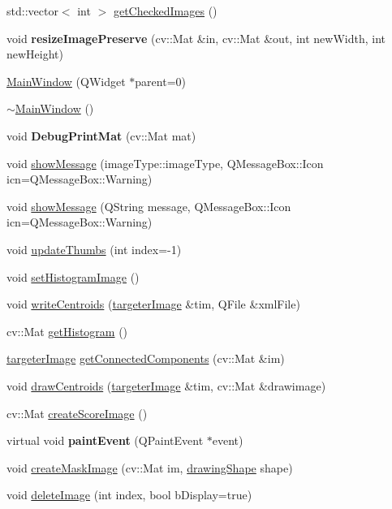 \begin{DoxyCompactItemize}
\item 
std\+::vector$<$ int $>$ \hyperlink{class_main_window_a1e798fdae21c3294495ea7994df1887a}{get\+Checked\+Images} ()
\item 
\mbox{\label{class_main_window_a2b4203abdf454313ed5bf11d38ae70f5}} 
void {\bfseries resize\+Image\+Preserve} (cv\+::\+Mat \&in, cv\+::\+Mat \&out, int new\+Width, int new\+Height)
\item 
\hyperlink{class_main_window_a8b244be8b7b7db1b08de2a2acb9409db}{Main\+Window} (Q\+Widget $\ast$parent=0)
\item 
\hyperlink{class_main_window_ae98d00a93bc118200eeef9f9bba1dba7}{$\sim$\+Main\+Window} ()
\item 
\mbox{\label{class_main_window_a838a9764a5001c205b964fd5e89742d2}} 
void {\bfseries Debug\+Print\+Mat} (cv\+::\+Mat mat)
\item 
void \hyperlink{class_main_window_a280d25148ac076ca817d411372584ae5}{show\+Message} (image\+Type\+::image\+Type, Q\+Message\+Box\+::\+Icon icn=Q\+Message\+Box\+::\+Warning)
\item 
void \hyperlink{class_main_window_aebde68c58d77b71d20fa6816b751356e}{show\+Message} (Q\+String message, Q\+Message\+Box\+::\+Icon icn=Q\+Message\+Box\+::\+Warning)
\item 
void \hyperlink{class_main_window_a89dfa31ef44692bb1d7307f0c35838c0}{update\+Thumbs} (int index=-\/1)
\item 
void \hyperlink{class_main_window_a5e130e8122dbab96f931a7ecc41086d3}{set\+Histogram\+Image} ()
\item 
void \hyperlink{class_main_window_aa137f4371bae807873da7862f4102521}{write\+Centroids} (\hyperlink{classtargeter_image}{targeter\+Image} \&tim, Q\+File \&xml\+File)
\item 
cv\+::\+Mat \hyperlink{class_main_window_a2734ce9308b5847a561f00b2fc9066aa}{get\+Histogram} ()
\item 
\hyperlink{classtargeter_image}{targeter\+Image} \hyperlink{class_main_window_a49cfabc6ef4845c5a9b5c9a92c9d4e2e}{get\+Connected\+Components} (cv\+::\+Mat \&im)
\item 
void \hyperlink{class_main_window_ad68b6789cc86ef20cd7cedd6de8d4ed2}{draw\+Centroids} (\hyperlink{classtargeter_image}{targeter\+Image} \&tim, cv\+::\+Mat \&drawimage)
\item 
cv\+::\+Mat \hyperlink{class_main_window_a8d87cd33d22ce614c9d7945264588e5f}{create\+Score\+Image} ()
\item 
\mbox{\label{class_main_window_abf05d580e91f725777cdb6a5eb0bf08c}} 
virtual void {\bfseries paint\+Event} (Q\+Paint\+Event $\ast$event)
\item 
void \hyperlink{class_main_window_a92a40847027eaf2cf258c3a9f8da4c48}{create\+Mask\+Image} (cv\+::\+Mat im, \hyperlink{structdrawing_shape}{drawing\+Shape} shape)
\item 
void \hyperlink{class_main_window_ad0219fc878a0bc02403d00a16b7fc7ec}{delete\+Image} (int index, bool b\+Display=true)
\end{DoxyCompactItemize}


